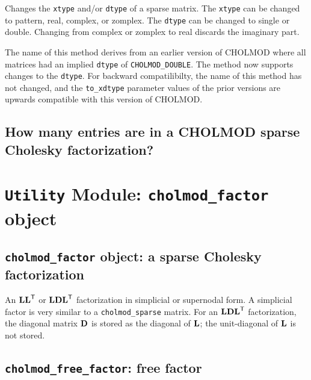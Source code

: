 \documentclass[11pt]{article}
\newcommand{\m}[1]{{\bf{#1}}}       %
\newcommand{\tr}{^{\sf T}}          %
\begin{document}

Changes the {\tt xtype} and/or \verb'dtype' of a sparse matrix.  The
\verb'xtype' can be changed to pattern, real, complex, or zomplex.  The
\verb'dtype' can be changed to single or double.  Changing from complex or
zomplex to real discards the imaginary part.

The name of this method derives from an earlier version of CHOLMOD where all
matrices had an implied \verb'dtype' of \verb'CHOLMOD_DOUBLE'.  The method now
supports changes to the \verb'dtype'.  For backward compatilibilty, the name of
this method has not changed, and the \verb'to_xdtype' parameter values of the
prior versions are upwards compatible with this version of CHOLMOD.

\subsection{How many entries are in a CHOLMOD sparse Cholesky factorization?}

\newpage \section{{\tt Utility} Module: {\tt cholmod\_factor} object}
\label{cholmod_factor}

\subsection{{\tt cholmod\_factor} object: a sparse Cholesky factorization}


An $\m{LL}\tr$ or $\m{LDL}\tr$ factorization in simplicial or supernodal form.
A simplicial factor is very similar to a {\tt cholmod\_sparse} matrix.
For an $\m{LDL}\tr$ factorization, the diagonal matrix $\m{D}$ is stored
as the diagonal of $\m{L}$; the unit-diagonal of $\m{L}$ is not stored.

\subsection{{\tt cholmod\_free\_factor}: free factor}
\end{document}
